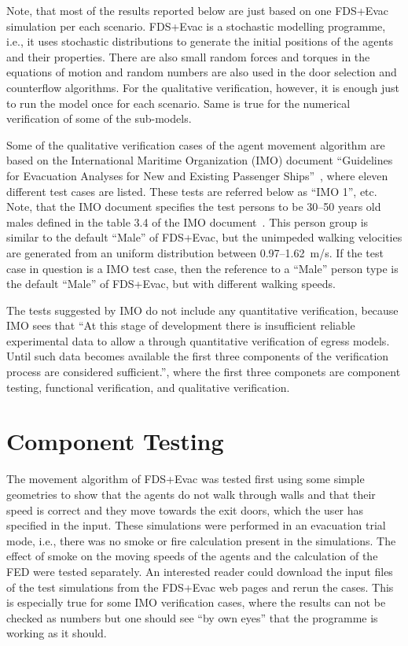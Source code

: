 \documentclass[12pt,a4paper,final,twoside]{stylevk}
\begin{document}
Note, that most of the results reported below are just based on one
FDS+Evac simulation per each scenario.  FDS+Evac is a stochastic
modelling programme, i.e., it uses stochastic distributions to
generate the initial positions of the agents and their properties.
There are also small random forces and torques in the equations of
motion and random numbers are also used in the door selection and
counterflow algorithms.  For the qualitative verification, however, it
is enough just to run the model once for each scenario.  Same is true
for the numerical verification of some of the sub-models.


Some of the qualitative verification cases of the agent movement
algorithm are based on the International Maritime Organization (IMO)
document ``Guidelines for Evacuation Analyses for New and Existing
Passenger Ships''~\cite{IMO07}, where eleven different test cases are
listed.  These tests are referred below as ``IMO 1'', etc.
Note, that the IMO document specifies the test persons to be 30--50
years old males defined in the table 3.4 of the IMO
document~\cite{IMO07}.  This person group is similar to the default
``Male'' of FDS+Evac, but the unimpeded walking velocities are
generated from an uniform distribution between 0.97--1.62~m/s.  If the
test case in question is a IMO test case, then the reference to a
``Male'' person type is the default ``Male'' of FDS+Evac, but with
different walking speeds.


The tests suggested by IMO do not include any quantitative
verification, because IMO sees that ``At this stage of development
there is insufficient reliable experimental data to allow a through
quantitative verification of egress models.  Until such data becomes
available the first three components of the verification process are
considered sufficient.'', where the first three componets are component
testing, functional verification, and qualitative verification.



\section{Component Testing}\label{Sec_CompTest}

\noindent The movement algorithm of FDS+Evac was tested first using
some simple geometries to show that the agents do not walk through
walls and that their speed is correct and they move towards the exit
doors, which the user has specified in the input.  These simulations
were performed in an evacuation trial mode, i.e., there was no
smoke or fire calculation present in the simulations.  The effect of
smoke on the moving speeds of the agents and the calculation of the
FED were tested separately.  An interested reader could download the
input files of the test simulations from the FDS+Evac web pages and
rerun the cases.  This is especially true for some IMO verification
cases, where the results can not be checked as numbers but one should
see ``by own eyes'' that the programme is working as it should.
\end{document}
